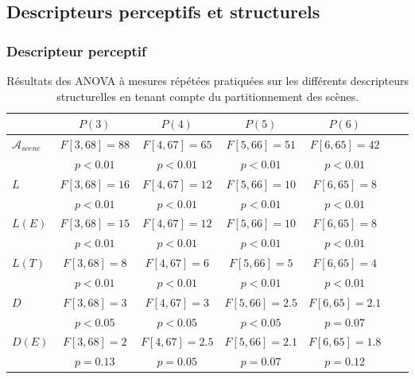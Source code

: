 \subsection{Descripteurs perceptifs et structurels}

\subsubsection{Descripteur perceptif}

\begin{table}[t]
\centering
\begin{tabular}{lcccccc}
                      & $P(3)$       & $P(4)$        & $P(5)$        & $P(6)$  \\
\hline
$\mathcal{A}_{scene}$ & $F[3,68]=88$ & $F[4,67]=65$  & $F[5,66]=51$  & $F[6,65]=42$  \\
                      & $p<0.01$     & $p<0.01$      & $p<0.01$      & $p<0.01$   \\
$L$                   & $F[3,68]=16$ & $F[4,67]=12$  & $F[5,66]=10$  & $F[6,65]=8$  \\
                      & $p<0.01$     & $p<0.01$      & $p<0.01$      & $p<0.01$   \\
$L(E)$                & $F[3,68]=15$ & $F[4,67]=12$  & $F[5,66]=10$  & $F[6,65]=8$  \\
                      & $p<0.01$     & $p<0.01$      & $p<0.01$      & $p<0.01$   \\
$L(T)$                & $F[3,68]=8$  & $F[4,67]=6$   & $F[5,66]=5$   & $F[6,65]=4$   \\
                      & $p<0.01$     & $p<0.01$      & $p<0.01$      & $p<0.01$   \\
$D$                   & $F[3,68]=3$  & $F[4,67]=3$   & $F[5,66]=2.5$ & $F[6,65]=2.1$  \\
                      & $p<0.05$     & $p<0.05$      & $p<0.05$      & $p=0.07$   \\
$D(E)$                & $F[3,68]=2$  & $F[4,67]=2.5$ & $F[5,66]=2.1$ & $F[6,65]=1.8$  \\
                      & $p=0.13$     & $p=0.05$      & $p=0.07$      & $p=0.12$   \\
\hline
\end{tabular}
\vspace{0.5mm}
\caption{Résultats des ANOVA à mesures répétées pratiquées sur les différents descripteurs structurelles en tenant compte du partitionnement des scènes.}
\label{tab:ANOVAhac}
\end{table}

